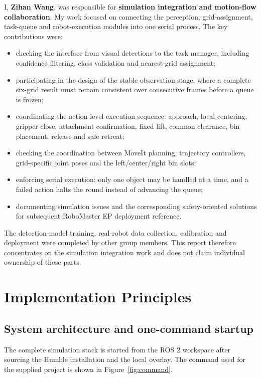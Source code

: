 \documentclass[11pt,a4paper]{article}
\begin{document}
I, \textbf{Zihan Wang}, was responsible for \textbf{simulation integration and motion-flow collaboration}. My work focused on connecting the perception, grid-assignment, task-queue and robot-execution modules into one serial process. The key contributions were:
\begin{itemize}
  \item checking the interface from visual detections to the task manager, including confidence filtering, class validation and nearest-grid assignment;
  \item participating in the design of the stable observation stage, where a complete six-grid result must remain consistent over consecutive frames before a queue is frozen;
  \item coordinating the action-level execution sequence: approach, local centering, gripper close, attachment confirmation, fixed lift, common clearance, bin placement, release and safe retreat;
  \item checking the coordination between MoveIt planning, trajectory controllers, grid-specific joint poses and the left/center/right bin slots;
  \item enforcing serial execution: only one object may be handled at a time, and a failed action halts the round instead of advancing the queue;
  \item documenting simulation issues and the corresponding safety-oriented solutions for subsequent RoboMaster EP deployment reference.
\end{itemize}

The detection-model training, real-robot data collection, calibration and deployment were completed by other group members. This report therefore concentrates on the simulation integration work and does not claim individual ownership of those parts.

\section{Implementation Principles}

\subsection{System architecture and one-command startup}

The complete simulation stack is started from the ROS 2 workspace after sourcing the Humble installation and the local overlay. The command used for the supplied project is shown in Figure~\ref{fig:command}.
\end{document}
